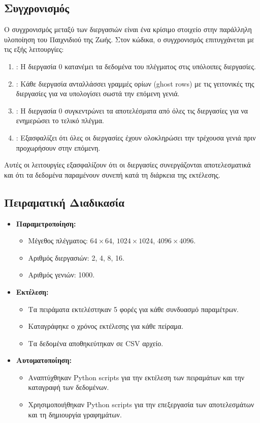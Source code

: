 \documentclass{article}
\begin{document}
\subsection*{Συγχρονισμός}
Ο συγχρονισμός μεταξύ των διεργασιών είναι ένα κρίσιμο στοιχείο στην παράλληλη υλοποίηση του Παιχνιδιού της Ζωής. Στον κώδικα, ο συγχρονισμός επιτυγχάνεται με τις εξής λειτουργίες:
\begin{enumerate}
    \item \textbf{}: Η διεργασία 0 κατανέμει τα δεδομένα του πλέγματος στις υπόλοιπες διεργασίες.
    \item \textbf{}: Κάθε διεργασία ανταλλάσσει γραμμές ορίων (ghost rows) με τις γειτονικές της διεργασίες για να υπολογίσει σωστά την επόμενη γενιά.
    \item \textbf{}: Η διεργασία 0 συγκεντρώνει τα αποτελέσματα από όλες τις διεργασίες για να ενημερώσει το τελικό πλέγμα.
    \item \textbf{}: Εξασφαλίζει ότι όλες οι διεργασίες έχουν ολοκληρώσει την τρέχουσα γενιά πριν προχωρήσουν στην επόμενη.
\end{enumerate}
Αυτές οι λειτουργίες εξασφαλίζουν ότι οι διεργασίες συνεργάζονται αποτελεσματικά και ότι τα δεδομένα παραμένουν συνεπή κατά τη διάρκεια της εκτέλεσης.
\subsection*{Πειραματική Διαδικασία}
\begin{itemize}
    \item \textbf{Παραμετροποίηση:}
    \begin{itemize}
        \item Μέγεθος πλέγματος: $64 \times 64$, $1024 \times 1024$, $4096 \times 4096$.
        \item Αριθμός διεργασιών: 2, 4, 8, 16.
        \item Αριθμός γενιών: 1000.
    \end{itemize}
    \item \textbf{Εκτέλεση:}
    \begin{itemize}
        \item Τα πειράματα εκτελέστηκαν 5 φορές για κάθε συνδυασμό παραμέτρων.
        \item Καταγράφηκε ο χρόνος εκτέλεσης για κάθε πείραμα.
        \item Τα δεδομένα αποθηκεύτηκαν σε CSV αρχείο.
    \end{itemize}
    \item \textbf{Αυτοματοποίηση:}
    \begin{itemize}
        \item Αναπτύχθηκαν Python scripts για την εκτέλεση των πειραμάτων και την καταγραφή των δεδομένων.
        \item Χρησιμοποιήθηκαν Python scripts για την επεξεργασία των αποτελεσμάτων και τη δημιουργία γραφημάτων.
    \end{itemize}
\end{itemize}
\end{document}
